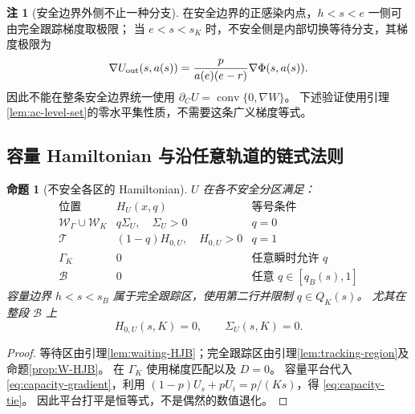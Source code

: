 \documentclass[11pt,a4paper,UTF8]{ctexart}
\newtheorem{proposition}[theorem]{命题}
\theoremstyle{definition}
\newtheorem{remark}[theorem]{注}
\begin{document}
\begin{remark}[安全边界外侧不止一种分支]
\label{rem:safe-gradient}
在安全边界的正感染内点，$h<s<e$ 一侧可由完全跟踪梯度取极限；
当 $e<s<s_K$ 时，不安全侧是内部切换等待分支，其梯度极限为
\[
\nabla U_{\rm out}(s,a(s))=
\frac{p}{a(e)(e-r)}\nabla\Phi(s,a(s)).
\]
因此不能在整条安全边界统一使用
$\partial_C U=\operatorname{conv}\{0,\nabla W\}$。
下述验证使用引理\ref{lem:ac-level-set}的零水平集性质，不需要这条广义梯度等式。
\end{remark}

\subsection{容量 Hamiltonian 与沿任意轨道的链式法则}
\begin{proposition}[不安全各区的 Hamiltonian]
\label{prop:all-HJB}
$U$ 在各不安全分区满足：
\begin{equation}
\begin{array}{c|c|c}
\text{位置}&H_U(x,q)&\text{等号条件}\\\hline
\mathcal W_\Gamma\cup\mathcal W_K&q\Sigma_U,\quad\Sigma_U>0&q=0\\
\mathcal T&(1-q)H_{0,U},\quad H_{0,U}>0&q=1\\
\Gamma_K&0&\text{任意瞬时允许 }q\\
\mathcal B&0&\text{任意 }q\in[q_B(s),1]
\end{array}
\label{eq:HJB-table}
\end{equation}
容量边界 $h<s<s_B$ 属于完全跟踪区，使用第二行并限制 $q\in Q_K(s)$。
尤其在整段 $\mathcal B$ 上
\begin{equation}
\boxed{H_{0,U}(s,K)=0,\qquad\Sigma_U(s,K)=0.}
\label{eq:capacity-tie}
\end{equation}
\end{proposition}
\begin{proof}
等待区由引理\ref{lem:waiting-HJB}；完全跟踪区由引理\ref{lem:tracking-region}及命题\ref{prop:W-HJB}。
在 $\Gamma_K$ 使用梯度匹配以及 $D=0$。
容量平台代入 \eqref{eq:capacity-gradient}，利用
$(1-p)U_s+pU_i=p/(Ks)$，得 \eqref{eq:capacity-tie}。
因此平台打平是恒等式，不是偶然的数值退化。
\end{proof}
\end{document}
